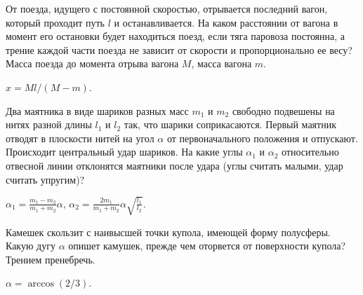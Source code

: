 \begin{ex}  %
От поезда, идущего с постоянной скоростью, отрывается последний вагон, который проходит путь $l$ и останавливается. На каком расстоянии от вагона в момент его остановки будет находиться поезд, если тяга паровоза постоянна, а трение каждой части поезда не зависит от скорости и пропорционально ее весу? Масса поезда до момента отрыва вагона $M$, масса вагона $m$.
\begin{ans}
$x = Ml/(M-m)$.
\end{ans}
\end{ex}

\begin{ex} %
Два маятника в виде шариков разных масс $m_1$ и $m_2$ свободно подвешены на нитях разной длины $l_1$ и $l_2$ так, что шарики соприкасаются. Первый маятник отводят в плоскости нитей на угол $\alpha$ от первоначального положения и отпускают. Происходит центральный удар шариков. На какие углы $\alpha_1$ и $\alpha_2$ относительно отвесной линии отклонятся маятники после удара (углы считать малыми, удар считать упругим)?
\begin{ans}
$\alpha_1 =\frac{m_1-m_2}{m_1+m_2}\alpha$, $\alpha_2 =\frac{2m_1}{m_1+m_2}\alpha \sqrt{\frac{l_1}{l_2}}$.
\end{ans}
\end{ex}

\begin{ex} %
Камешек скользит с наивысшей точки купола, имеющей форму полусферы. Какую дугу $\alpha$ опишет камушек, прежде чем оторвется от поверхности купола? Трением пренебречь.
\begin{ans}
$\alpha = \arccos(2/3)$.
\end{ans}
\end{ex}

\clearpage